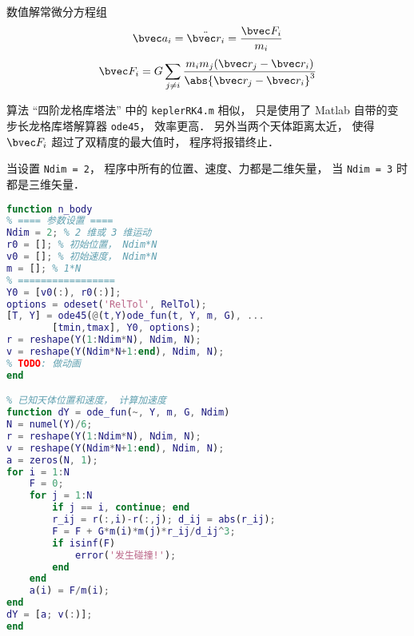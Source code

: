 
\begin{issues}
\issueDraft
\end{issues}


数值解常微分方程组
\begin{equation}
\bvec a_i = \ddot{\bvec r_i} = \frac{\bvec F_i}{m_i}
\end{equation}
\begin{equation}
\bvec F_i = G\sum_{j\ne i} \frac{m_i m_j(\bvec r_j - \bvec r_i)}{\abs{\bvec r_j - \bvec r_i}^3}
\end{equation}

算法 “四阶龙格库塔法” 中的 \verb|keplerRK4.m| 相似， 只是使用了 Matlab 自带的变步长龙格库塔解算器 \verb|ode45|， 效率更高． 另外当两个天体距离太近， 使得 $\bvec F_i$ 超过了双精度的最大值时， 程序将报错终止．

当设置 \verb|Ndim = 2|， 程序中所有的位置、速度、力都是二维矢量， 当 \verb|Ndim = 3| 时都是三维矢量．

\begin{lstlisting}[language=matlab]
% N 体问题（支持二维或三维）
function n_body
% ==== 参数设置 ====
Ndim = 2; % 2 维或 3 维运动
r0 = []; % 初始位置， Ndim*N
v0 = []; % 初始速度， Ndim*N
m = []; % 1*N
% =================
Y0 = [v0(:), r0(:)];
options = odeset('RelTol', RelTol);
[T, Y] = ode45(@(t,Y)ode_fun(t, Y, m, G), ...
        [tmin,tmax], Y0, options);
r = reshape(Y(1:Ndim*N), Ndim, N);
v = reshape(Y(Ndim*N+1:end), Ndim, N);
% TODO: 做动画
end

% 已知天体位置和速度， 计算加速度
function dY = ode_fun(~, Y, m, G, Ndim)
N = numel(Y)/6;
r = reshape(Y(1:Ndim*N), Ndim, N);
v = reshape(Y(Ndim*N+1:end), Ndim, N);
a = zeros(N, 1);
for i = 1:N
    F = 0;
    for j = 1:N
        if j == i, continue; end
        r_ij = r(:,i)-r(:,j); d_ij = abs(r_ij);
        F = F + G*m(i)*m(j)*r_ij/d_ij^3;
        if isinf(F)
            error('发生碰撞!');
        end
    end
    a(i) = F/m(i);
end
dY = [a; v(:)];
end
\end{lstlisting}
